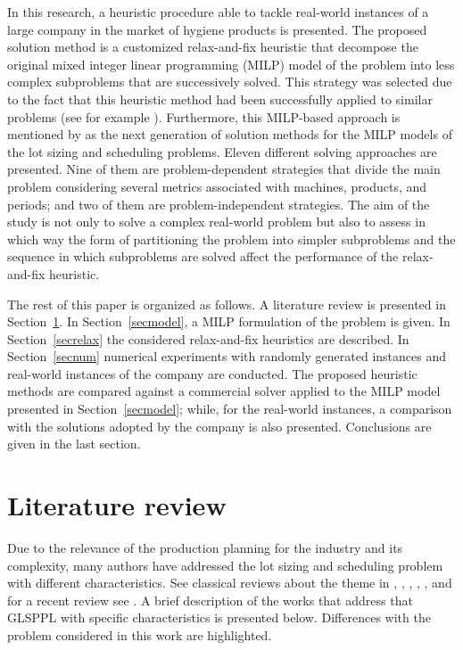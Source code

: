 \documentclass[11pt]{article}
\begin{document}
In this research, a heuristic procedure able to tackle real-world instances of a large company in the market of hygiene products  is  presented. The proposed solution method is a customized relax-and-fix heuristic that decompose the original mixed integer linear programming (MILP) model of the problem into less complex subproblems that are successively solved. This strategy was selected due to the fact that this heuristic method had been successfully applied to similar problems (see for example \citet{clark2000rolling, beraldi2008rolling, lang2011fix, soler2020}). Furthermore, this MILP-based approach is mentioned by \cite{copil} as the next generation of solution methods for the MILP models of the lot sizing and scheduling problems. Eleven different solving approaches are presented. Nine of them are problem-dependent strategies that divide the main problem considering several metrics associated with machines, products, and periods; and two of them are problem-independent strategies. The aim of the study is not only to solve a complex real-world problem but also to assess in which way the form of partitioning the problem into simpler subproblems and the sequence in which subproblems are solved affect the performance of the relax-and-fix heuristic.

The rest of this paper is organized as follows. A literature review is presented in Section~\ref{seclierature}. In Section~\ref{secmodel}, a  MILP formulation of the problem is given. In Section~\ref{secrelax} the considered relax-and-fix heuristics are described. In Section~\ref{secnum} numerical experiments with randomly generated instances and real-world instances of the company are conducted.
The proposed heuristic methods are compared against a commercial solver applied to the MILP model presented in Section~\ref{secmodel}; while, for the real-world instances, a comparison with the solutions adopted by the company is also presented. Conclusions are given in the last section.

\section{Literature review}
\label{seclierature}

Due to the relevance of the production planning for the industry and its complexity, many authors have addressed the lot sizing and scheduling problem with different characteristics. See classical reviews about the theme in \cite{drexl1997lot}, \cite{karimi2003capacitated}, \cite{zhu2006scheduling}, \cite{quadt2008capacitated}, \cite{robinson2009coordinated}, and for a recent review see \cite{copil}. A brief description of the works that address that GLSPPL with specific characteristics is presented below. Differences with the problem considered in this work are highlighted.
\end{document}
